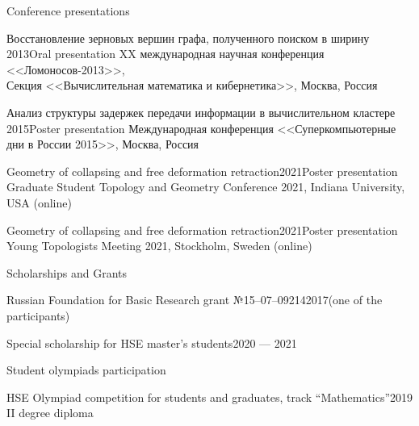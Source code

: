 \documentclass{resume}
\begin{document}
\begin{rSection}{Conference presentations}
  \begin{rSubsection}{Восстановление зерновых вершин графа, полученного поиском в
      ширину }{2013}{Oral presentation}
    XX международная научная конференция <<Ломоносов-2013>>, \\
    Секция <<Вычислительная математика и кибернетика>>, Москва, Россия
  \end{rSubsection}

  \begin{rSubsection}{Анализ структуры задержек передачи информации в вычислительном кластере }{2015}{Poster presentation}
    Международная конференция <<Суперкомпьютерные дни в России 2015>>, Москва, Россия
  \end{rSubsection}

  \begin{rSubsection}{Geometry of collapsing and free deformation retraction}{2021}{Poster presentation}
    Graduate Student Topology and Geometry Conference 2021, Indiana University, USA (online)
  \end{rSubsection}

  \begin{rSubsection}{Geometry of collapsing and free deformation retraction}{2021}{Poster presentation}
    Young Topologists Meeting 2021, Stockholm, Sweden (online)
  \end{rSubsection}
\end{rSection}

\begin{rSection}{Scholarships and Grants}
  \begin{rSubsection}{Russian Foundation for Basic Research grant №15--07--09214}{2017}{(one of the participants)}
  \end{rSubsection}

  \begin{rSubsection}{Special scholarship for HSE master's students}{2020 --- 2021}{}
  \end{rSubsection}
\end{rSection}

\begin{rSection}{Student olympiads participation}
  \begin{rSubsection}{HSE Olympiad competition for students and graduates, track ``Mathematics''}{2019}{}
    II degree diploma
  \end{rSubsection}
\end{rSection}
\end{document}
